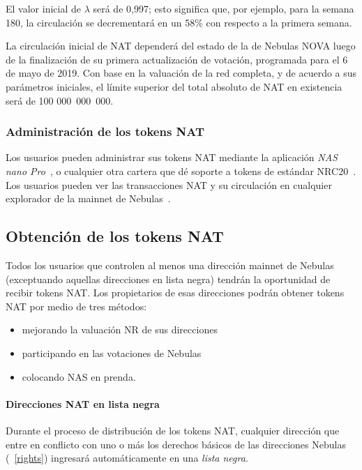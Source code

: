 El valor inicial de $\lambda$ será de 0,997; esto significa que, por ejemplo, para la semana 180, la circulación se decrementará en un 58\% con respecto a la primera semana.

La circulación inicial de NAT dependerá del estado de la \mainnet de Nebulas NOVA luego de la finalización de su primera actualización de votación, programada para el 6 de mayo de 2019. Con base en la valuación \nr de la red completa, y de acuerdo a sus parámetros iniciales, el límite superior del total absoluto de NAT en existencia será de 100 000 000 000.

\subsubsection{Administración de los tokens NAT}

Los usuarios pueden administrar sus tokens NAT mediante la aplicación \textit{NAS nano Pro}~\cite{NASnano}, o cualquier otra cartera que dé soporte a tokens de estándar NRC20~\cite{wallets}. Los usuarios pueden ver las transacciones NAT y su circulación en cualquier explorador \blockchain de la mainnet de Nebulas~\cite{explorer}.

\subsection{Obtención de los tokens NAT}

Todos los usuarios que controlen al menos una dirección mainnet de Nebulas (exceptuando aquellas direcciones en lista negra) tendrán la oportunidad de recibir tokens NAT. Los propietarios de esas direcciones podrán obtener tokens NAT por medio de tres métodos:

\begin{itemize}
	\item mejorando la valuación NR de sus direcciones
	\item participando en las votaciones \onchain de Nebulas
	\item colocando NAS en prenda.
\end{itemize}

\paragraph{Direcciones NAT en lista negra}

Durante el proceso de distribución de los tokens NAT, cualquier dirección que entre en conflicto con uno o más los derechos básicos de las direcciones Nebulas (~\ref{rights}) ingresará automáticamente en una \textit{lista negra}.

